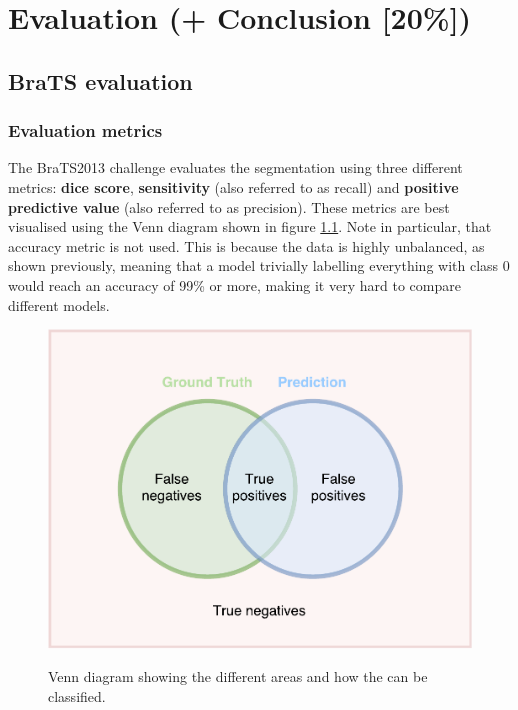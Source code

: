 \documentclass[12pt,a4paper,twoside,openright]{report}
\begin{document}
\chapter{Evaluation (+ Conclusion [20\%])}

\section{BraTS evaluation}
\subsection{Evaluation metrics}
The BraTS2013 challenge \cite{brats-proceedings} evaluates the segmentation using three different metrics: \textbf{dice score}, \textbf{sensitivity} (also referred to as recall) and \textbf{positive predictive value} (also referred to as precision). These metrics are best visualised using the Venn diagram shown in figure \ref{fig:evaluation_venn_diagram}.  Note in particular, that accuracy metric is not used. This is because the data is highly unbalanced, as shown previously, meaning that a model trivially labelling everything with class 0 would reach an accuracy of 99\% or more, making it very hard to compare different models.

\begin{figure}
	\centering
	\includegraphics[scale = 0.5]{evaluation_venn_diagram}
	\label{fig:evaluation_venn_diagram}
	\caption{Venn diagram showing the different areas and how the can be classified.}
\end{figure}
\end{document}
